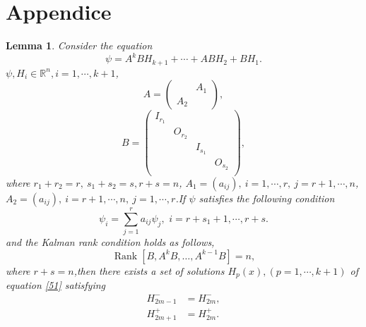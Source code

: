 \documentclass[a4paper,reqno,11pt]{amsart}
\numberwithin{equation}{section} %
\newtheorem{lem}{Lemma}[section]
\begin{document}
\section{Appendice}
\begin{lem}\label{l50}
	Consider the equation
	\begin{equation}\label{51}
		\psi =A^kBH_{k+1} +\cdots +ABH_2 +BH_1.
	\end{equation}
	$\psi , H_i \in \mathbb{R} ^n ,i = 1,\cdots,k+1$,
	$$
	A=\left(\begin{array}{ll} 
		& A_1 \\
		A_2 &
	\end{array}\right),
	$$
	$$
	B=\left( \begin{matrix}
		I_{r_1}&		&		&		\\
		&		O_{r_2}&		&		\\
		&		&		I_{s_1}&		\\
		&		&		&		O_{s_2}\\
	\end{matrix} \right) ,
	$$
	where $r_1 +r_2 =r,\ s_1+s_2=s, r+s=n $, $A_1=\left( a_{ij} \right) ,\ i=1,\cdots ,r,\ j=r+1,\cdots ,n$, $A_2=\left( a_{ij} \right) ,\ i=r+1,\cdots ,n,\ j=1,\cdots ,r$.If $\psi$ satisfies the following condition
	\begin{equation}\label{52}
		\psi _i=\sum_{j=1}^r{a_{ij}\psi _j ,\,\,i=r+s_1+1,\cdots ,r+s.}
	\end{equation}
	and the Kalman rank condition holds as follows,
	\begin{equation}\label{53}
		\operatorname{Rank}\left[B, A^k B, \ldots, A^{k-1} B\right]=n,
	\end{equation}
	where $r+s=n$,then there exists a set of solutions $H_p (x), (p = 1, \cdots , k+1)$ of equation \eqref{51} satisfying
	\begin{align}
		H^{-}_{2m-1} &= H^{-}_{2m}\label{55} ,\\
		H^{+}_{2m+1} &= H^{+}_{2m}\label{56} .
	\end{align}
\end{lem}
\end{document}
